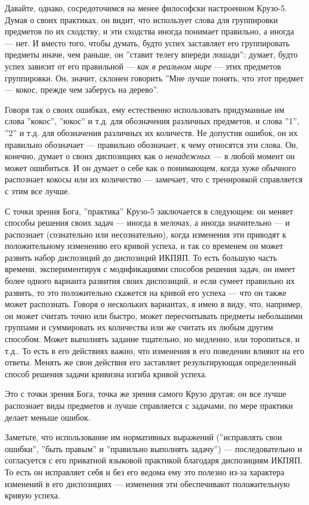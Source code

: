 \documentclass[11pt]{book}
\begin{document}
Давайте, однако, сосредоточимся на менее философски настроенном Крузо-5. Думая о своих практиках, он видит, что использует слова для группировки предметов по их сходству, и эти сходства иногда понимает правильно, а иногда --- нет. И вместо того, чтобы думать, будто успех заставляет его группировать предметы иначе, чем раньше, он ''ставит телегу впереди лошади'': думает, будто успех зависит от его правильной --- \textit{как в реальном мире} --- этих предметов группировки. Он, значит, склонен говорить ''Мне лучше понять, что этот предмет --- кокос, прежде чем заберусь на дерево''.

Говоря так о своих ошибках, ему естественно использовать придуманные им слова ''кокос'', ''юкос'' и т.д. для обозначения различных предметов, и слова ''1'', ''2'' и т.д. для обозначения различных их количеств. Не допустив ошибок, он их правильно обозначает --- правильно обозначает, к чему относятся эти слова. Он, конечно, думает о своих диспозициях как о \textit{ненадежных} --- в любой момент он может ошибиться. И он думает о себе как о понимающем, когда хуже обычного распознает кокосы или их количество --- замечает, что с тренировкой справляется с этим все лучше.

С точки зрения Бога, ''практика'' Крузо-5 заключается в следующем: он меняет способы решения своих задач --- иногда в мелочах, а иногда значительно --- и распознает (сознательно или несознательно), когда изменения эти приводят к положительному изменению его кривой успеха, и так со временем он может развить набор диспозиций до диспозиций ИКПЯП. То есть большую часть времени, экспериментируя с модификациями способов решения задач, он имеет более одного варианта развития своих диспозиций, и если сумеет правильно их развить, то это положительно скажется на кривой его успеха --- что он также может распознать. Говоря о нескольких вариантах, я имею в виду, что, например, он может считать точно или быстро, может пересчитывать предметы небольшими группами и суммировать их количества или же считать их любым другим способом. Может выполнять задание тщательно, но медленно, или торопиться, и т.д.. То есть в его действиях важно, что изменения в его поведении влияют на его ответы. Менять же свои действия его заставляет результирующая определенный способ решения задачи кривизна изгиба кривой успеха.

Это с точки зрения Бога, точка же зрения самого Крузо другая: он все лучше распознает виды предметов и лучше справляется с задачами, по мере практики делает меньше ошибок.

Заметьте, что использование им нормативных выражений (''исправлять свои ошибки'', ''быть правым'' и ''правильно выполнять задачу'') --- последовательно и согласуется с его приватной языковой практикой благодаря диспозициям ИКПЯП. То есть он исправляет себя и без его ведома ему это полезно из-за характера изменений в его диспозициях --- изменения эти обеспечивают положительную кривую успеха.
\end{document}
